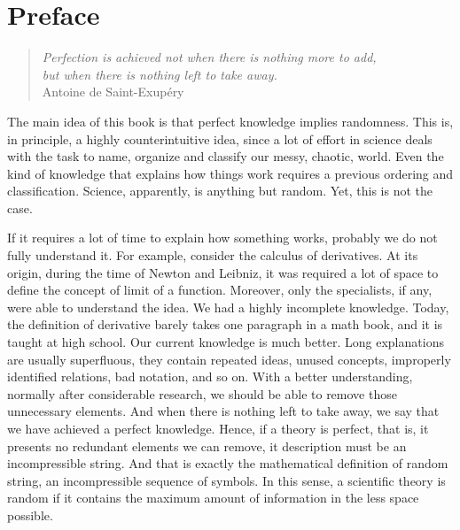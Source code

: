 %
%


\chapter*{Preface}

\begin{quote}
\begin{flushright}
\emph{Perfection is achieved not when there is nothing more to add, \\
but when there is nothing left to take away.}\\
Antoine de Saint-Exupéry\\
\end{flushright}
\end{quote}
\bigskip


The main idea of this book is that perfect knowledge implies randomness. This is, in principle, a highly counterintuitive idea, since a lot of effort in science deals with the task to name, organize and classify our messy, chaotic, world. Even the kind of knowledge that explains how things work requires a previous ordering and classification. Science, apparently, is anything but random. Yet, this is not the case.

If it requires a lot of time to explain how something works, probably we do not fully understand it. For example, consider the calculus of derivatives. At its origin, during the time of Newton and Leibniz, it was required a lot of space to define the concept of limit of a function. Moreover, only the specialists, if any, were able to understand the idea. We had a highly incomplete knowledge. Today, the definition of derivative barely takes one paragraph in a math book, and it is taught at high school. Our current knowledge is much better. Long explanations are usually superfluous, they contain repeated ideas, unused concepts, improperly identified relations, bad notation, and so on. With a better understanding, normally after considerable research, we should be able to remove those unnecessary elements. And when there is nothing left to take away, we say that we have achieved a perfect knowledge. Hence, if a theory is perfect, that is, it presents no redundant elements we can remove, it description must be an incompressible string. And that is exactly the mathematical definition of random string, an incompressible sequence of symbols. In this sense, a scientific theory is random if it contains the maximum amount of information in the less space possible.

